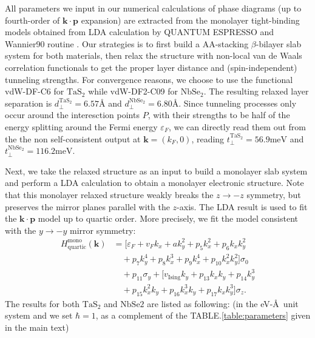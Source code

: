 \begin{subappendices}
	All parameters we input in our numerical calculations of phase diagrams (up to fourth-order of $\bm{k\cdot p}$ expansion) are extracted from the monolayer tight-binding models obtained from LDA calculation by QUANTUM ESPRESSO \cite{giannozzi2009quantum,giannozzi2017advanced} and Wannier90 routine \cite{pizzi2020wannier90}. Our strategies is to first build a AA-stacking $\beta$-bilayer slab system for both materials, then relax the structure with non-local van de Waals correlation functionals to get the proper layer distance and (spin-independent) tunneling strengths. For convergence reasons, we choose to use the functional vdW-DF-C6 \cite{tkatchenko2009accurate,berland2019van} for $\mathrm{TaS_2}$ while vdW-DF2-C09 \cite{lee2010higher,cooper2010van} for $\mathrm{NbSe_2}$. The resulting relaxed layer separation is $d_\perp^{\mathrm{TaS_2}}=6.57\text{\AA}$ and $d_\perp^{\mathrm{NbSe_2}}=6.80\text{\AA}$. Since tunneling processes only occur around the interesction points $P$, with their strengths to be half of the energy splitting around the Fermi energy $\varepsilon_F$, we can directly read them out from the the non self-consistent output at $\bm{k}=(k_F,0)$, reading $t_\perp^{\mathrm{TaS_2}}=56.9\mathrm{meV}$ and $t_\perp^{\mathrm{NbSe_2}}=116.2\mathrm{meV}$.\par
	Next, we take the relaxed structure as an input to build a monolayer slab system and perform a LDA calculation to obtain a monolayer electronic structure. Note that this monolayer relaxed structure weakly breaks the $z\rightarrow -z$ symmetry, but preserves the mirror planes parallel with the $z$-axis. The LDA result is used to fit the $\bm{k\cdot p}$ model up to quartic order. More precisely, we fit the model consistent with the $y\rightarrow -y$ mirror symmetry:
	\begin{align}\label{monolayer quartic kdotp expansion}
		H^{\text{mono}}_{\text{quartic}}(\bm{k}) & =\bigg[\varepsilon_F +v_F k_x + a k_y^2 + p_5 k_x^2 + p_6 k_x k_y^2\nonumber                 \\
		                                         & \quad + p_7 k_y^4 + p_8 k_x^3 + p_9 k_x^4 + p_{10} k_x^2 k_y^2\bigg]\sigma_0\nonumber        \\
		                                         & \quad + p_{11}\sigma_y +\bigg[ v_{\text{Ising}} k_y + p_{13} k_x k_y + p_{14} k_y^3\nonumber \\
		                                         & \quad + p_{15} k_x^2 k_y + p_{16} k_x^3 k_y + p_{17} k_x k_y^3\bigg]\sigma_z.
	\end{align}
	The results for both $\mathrm{TaS_2}$ and $\mathrm{NbSe2}$ are listed as following: (in the eV-\AA~unit system and we set $\hbar=1$, as a complement of the TABLE.\ref{table:parameters} given in the main text)


\end{subappendices}
